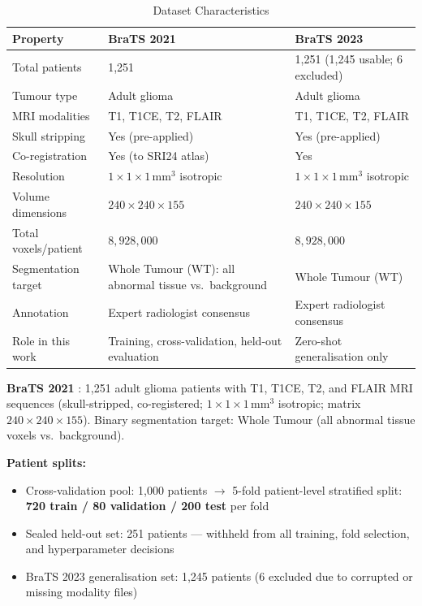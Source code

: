 \documentclass{article}
\begin{document}
\begin{table}[htbp]
\caption{Dataset Characteristics}
\label{tab:dataset}
\begin{center}
\begin{tabularx}{\textwidth}{|l|X|X|}
\hline
\textbf{Property} & \textbf{BraTS 2021} \cite{menze2015multimodal, bakas2021brats, bakas2017advancing} & \textbf{BraTS 2023} \cite{bakas2021brats} \\
\hline
Total patients & 1,251 & 1,251 (1,245 usable; 6 excluded) \\
\hline
Tumour type & Adult glioma & Adult glioma \\
\hline
MRI modalities & T1, T1CE, T2, FLAIR & T1, T1CE, T2, FLAIR \\
\hline
Skull stripping & Yes (pre-applied) & Yes (pre-applied) \\
\hline
Co-registration & Yes (to SRI24 atlas) & Yes \\
\hline
Resolution & $1\times1\times1$\,mm$^3$ isotropic & $1\times1\times1$\,mm$^3$ isotropic \\
\hline
Volume dimensions & $240\times240\times155$ & $240\times240\times155$ \\
\hline
Total voxels/patient & $8{,}928{,}000$ & $8{,}928{,}000$ \\
\hline
Segmentation target & Whole Tumour (WT): all abnormal tissue vs.\ background & Whole Tumour (WT) \\
\hline
Annotation & Expert radiologist consensus & Expert radiologist consensus \\
\hline
Role in this work & Training, cross-validation, held-out evaluation & Zero-shot generalisation only \\
\hline
\end{tabularx}
\end{center}
\end{table}

\textbf{BraTS 2021} \cite{menze2015multimodal, bakas2021brats, bakas2017advancing}:
1,251 adult glioma patients with T1, T1CE, T2, and FLAIR MRI sequences
(skull-stripped, co-registered; $1\times1\times1$\,mm$^3$ isotropic; matrix
$240\times240\times155$). Binary segmentation target: Whole Tumour (all abnormal
tissue voxels vs.\ background).

\textbf{Patient splits:}
\begin{itemize}
    \item Cross-validation pool: 1,000 patients $\rightarrow$ 5-fold patient-level
    stratified split: \textbf{720 train / 80 validation / 200 test} per fold

    \item Sealed held-out set: 251 patients --- withheld from all training, fold
    selection, and hyperparameter decisions

    \item BraTS 2023 generalisation set: 1,245 patients (6 excluded due to
    corrupted or missing modality files)
\end{itemize}
\end{document}
